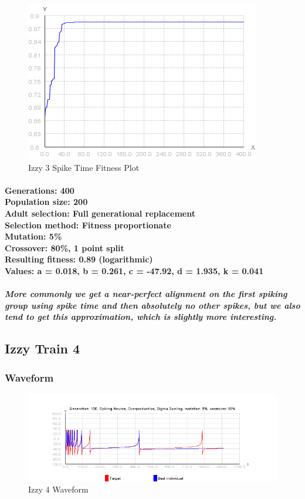 \documentclass[titlepage,norsk]{article}
\begin{document}
\begin{figure}[h!]
\centering
\includegraphics[scale=0.75]{izzy3spikeFitness.png}
\caption{Izzy 3 Spike Time Fitness Plot}
\label{fig:awesome_image}
\end{figure}

\paragraph{
Generations: 400\\
Population size: 200\\
Adult selection: Full generational replacement \\
Selection method: Fitness proportionate\\
Mutation: 5\% \\
Crossover: 80\%, 1 point split \\
Resulting fitness: 0.89 (logarithmic) \\
Values: a = 0.018, b = 0.261, c = -47.92, d = 1.935, k = 0.041 \\
}

\subparagraph{More commonly we get a near-perfect alignment on the first spiking group using spike time and then absolutely no other spikes, but we also tend to get this approximation, which is slightly more interesting.
}


\subsection{Izzy Train 4}

\subsubsection{Waveform}

\begin{figure}[h!]
\centering
\includegraphics[scale=0.75]{izzy4wave.png}
\caption{Izzy 4 Waveform}
\label{fig:awesome_image}
\end{figure}
\end{document}
